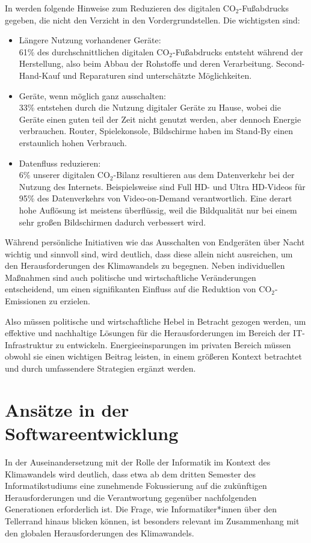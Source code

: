 \documentclass{article}
\begin{document}
In \cite{digitale_leicht_2021} werden folgende Hinweise zum Reduzieren des  digitalen CO$_2$-Fußabdrucks gegeben, die nicht den Verzicht in den Vordergrundstellen.
Die wichtigsten sind:
\begin{itemize}
	\item Längere Nutzung vorhandener Geräte:\\
	    61\% des durchschnittlichen digitalen CO$_2$-Fußabdrucks 
entsteht während der Herstellung, also  beim Abbau
der  Rohstoffe und deren Verarbeitung.  
Second-Hand-Kauf  und Reparaturen sind unterschätzte Möglichkeiten. 
  \item Geräte, wenn möglich ganz ausschalten:\\
	    33\% entstehen durch die  Nutzung digitaler Geräte zu Hause, wobei die Geräte einen guten teil der Zeit nicht genutzt werden, aber dennoch Energie verbrauchen.
			Router, Spielekonsole, Bildschirme haben  im Stand-By einen erstaunlich hohen Verbrauch.
	\item Datenfluss reduzieren:\\
	6\% unserer digitalen CO$_2$-Bilanz resultieren aus dem Datenverkehr bei der Nutzung des Internets. 
	Beispielsweise sind Full HD- und Ultra HD-Videos für 95\% des Datenverkehrs von Video-on-Demand verantwortlich. Eine derart hohe Auflösung ist meistens  überflüssig, weil die Bildqualität nur bei einem sehr großen Bildschirmen dadurch verbessert wird.
\end{itemize}



 Während persönliche Initiativen wie das Ausschalten von Endgeräten über Nacht wichtig und sinnvoll sind, wird deutlich, dass diese allein nicht ausreichen, um den Herausforderungen des Klimawandels zu begegnen. Neben individuellen Maßnahmen sind auch politische und wirtschaftliche Veränderungen entscheidend, um einen signifikanten Einfluss auf die Reduktion von CO$_2$-Emissionen zu erzielen.

Also müssen   politische und wirtschaftliche Hebel in Betracht gezogen werden, um effektive und nachhaltige Lösungen für die Herausforderungen im Bereich der IT-Infrastruktur zu entwickeln. 
Energieeinsparungen im privaten Bereich müssen  obwohl sie einen wichtigen Beitrag leisten, in einem größeren Kontext betrachtet und durch umfassendere Strategien ergänzt werden.





\section{Ansätze in der Softwareentwicklung}
In der Auseinandersetzung mit der Rolle der Informatik im Kontext des Klimawandels wird deutlich, dass etwa ab dem dritten Semester des Informatikstudiums eine zunehmende Fokussierung auf die zukünftigen Herausforderungen und die Verantwortung gegenüber nachfolgenden Generationen erforderlich ist. Die Frage, wie Informatiker*innen  über den Tellerrand hinaus blicken können, ist besonders relevant im Zusammenhang mit den globalen Herausforderungen des Klimawandels.
\end{document}
